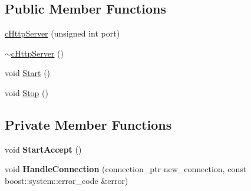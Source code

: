 \subsection*{\-Public \-Member \-Functions}
\begin{DoxyCompactItemize}
\item 
\hyperlink{classhttp__server_1_1cHttpServer_a26d917897dda50502ea1469fb5af9c2e}{c\-Http\-Server} (unsigned int port)
\item 
\hyperlink{classhttp__server_1_1cHttpServer_a783dd5b31b19b8a95e6c2ce7c188a7c9}{$\sim$c\-Http\-Server} ()
\item 
void \hyperlink{classhttp__server_1_1cHttpServer_ad4699b20627615aee961a06eae97fb89}{\-Start} ()
\item 
void \hyperlink{classhttp__server_1_1cHttpServer_a2c7bcb8fb8ca1aa5fe26d00c94c11835}{\-Stop} ()
\end{DoxyCompactItemize}
\subsection*{\-Private \-Member \-Functions}
\begin{DoxyCompactItemize}
\item 
\hypertarget{classhttp__server_1_1cHttpServer_abec1513422a3b70b8c3684f4dc8c6271}{void {\bfseries \-Start\-Accept} ()}\label{classhttp__server_1_1cHttpServer_abec1513422a3b70b8c3684f4dc8c6271}

\item 
\hypertarget{classhttp__server_1_1cHttpServer_adfe4c5b575c0e94174a64d228f152d46}{void {\bfseries \-Handle\-Connection} (connection\-\_\-ptr new\-\_\-connection, const boost\-::system\-::error\-\_\-code \&error)}\label{classhttp__server_1_1cHttpServer_adfe4c5b575c0e94174a64d228f152d46}

\end{DoxyCompactItemize}
